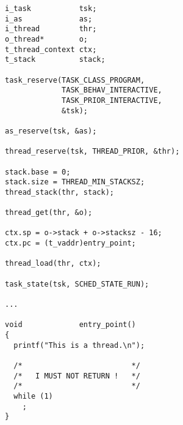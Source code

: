 \begin{verbatim}
i_task           tsk;
i_as             as;
i_thread         thr;
o_thread*        o;
t_thread_context ctx;
t_stack          stack;

task_reserve(TASK_CLASS_PROGRAM,
             TASK_BEHAV_INTERACTIVE,
             TASK_PRIOR_INTERACTIVE,
             &tsk);

as_reserve(tsk, &as);

thread_reserve(tsk, THREAD_PRIOR, &thr);

stack.base = 0;
stack.size = THREAD_MIN_STACKSZ;
thread_stack(thr, stack);

thread_get(thr, &o);

ctx.sp = o->stack + o->stacksz - 16;
ctx.pc = (t_vaddr)entry_point;

thread_load(thr, ctx);

task_state(tsk, SCHED_STATE_RUN);

...

void             entry_point()
{
  printf("This is a thread.\n");

  /*                         */
  /*   I MUST NOT RETURN !   */
  /*                         */
  while (1)
    ;
}
\end{verbatim}
